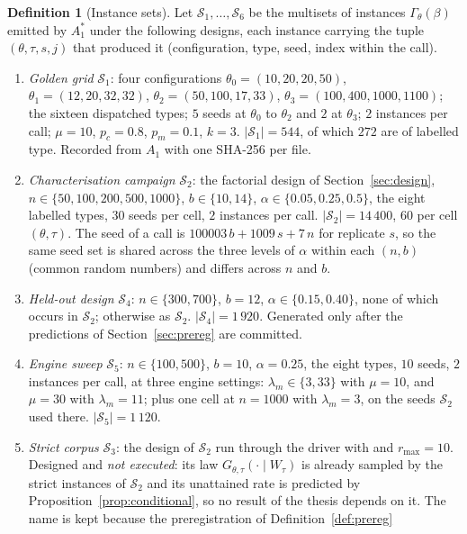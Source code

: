 \documentclass[a4paper,11pt]{article}
\newcommand{\Gam}{\Gamma_{\theta}}
\newcommand{\code}[1]{\path{#1}}
\newcommand{\Aone}{A_{1}}
\newcommand{\Astar}{A_{1}^{*}}
\newcommand{\Gtt}{G_{\theta,\tau}}
\theoremstyle{plain}
\theoremstyle{definition}
\newtheorem{definition}{Definition}
\theoremstyle{remark}
\begin{document}
\begin{definition}[Instance sets]\label{def:sets}
Let $\mathcal S_1,\dots,\mathcal S_6$ be the multisets of instances
$\Gam(\beta)$ emitted by $\Astar$ under the following designs, each instance carrying the
tuple $(\theta,\tau,s,j)$ that produced it (configuration, type, seed, index within the
call).
\begin{enumerate}[leftmargin=1.8em,itemsep=2pt]
\item \emph{Golden grid} $\mathcal S_1$: four configurations
$\theta_0=(10,20,20,50)$, $\theta_1=(12,20,32,32)$, $\theta_2=(50,100,17,33)$,
$\theta_3=(100,400,1000,1100)$; the sixteen dispatched types; $5$ seeds at $\theta_0$ to
$\theta_2$ and $2$ at $\theta_3$; $2$ instances per call; $\mu=10$, $p_c=0.8$, $p_m=0.1$,
$k=3$. $|\mathcal S_1|=544$, of which $272$ are of labelled type. Recorded from $\Aone$ with
one SHA-256 per file.
\item \emph{Characterisation campaign} $\mathcal S_2$: the factorial design of
Section~\ref{sec:design}, $n\in\{50,100,200,500,1000\}$, $b\in\{10,14\}$,
$\alpha\in\{0.05,0.25,0.5\}$, the eight labelled types, $30$ seeds per cell, $2$ instances
per call. $|\mathcal S_2|=14\,400$, $60$ per cell $(\theta,\tau)$. The seed of a call is
$100003\,b+1009\,s+7\,n$ for replicate $s$, so the same seed set is shared across the three
levels of $\alpha$ within each $(n,b)$ (common random numbers) and differs across $n$ and $b$.
\item \emph{Held-out design} $\mathcal S_4$: $n\in\{300,700\}$, $b=12$,
$\alpha\in\{0.15,0.40\}$, none of which occurs in $\mathcal S_2$; otherwise as $\mathcal S_2$.
$|\mathcal S_4|=1\,920$. Generated only after the predictions of Section~\ref{sec:prereg} are
committed.
\item \emph{Engine sweep} $\mathcal S_5$: $n\in\{100,500\}$, $b=10$, $\alpha=0.25$, the eight
types, $10$ seeds, $2$ instances per call, at three engine settings: $\lambda_m\in\{3,33\}$
with $\mu=10$, and $\mu=30$ with $\lambda_m=11$; plus one cell at $n=1000$ with
$\lambda_m=3$, on the seeds $\mathcal S_2$ used there. $|\mathcal S_5|=1\,120$.
\item \emph{Strict corpus} $\mathcal S_3$: the design of $\mathcal S_2$ run through the driver
with \code{--require-strict} and $r_{\max}=10$. Designed and \emph{not executed}: its law
$\Gtt(\cdot\mid W_\tau)$ is already sampled by the strict instances of $\mathcal S_2$ and its
unattained rate is predicted by Proposition~\ref{prop:conditional}, so no result of the thesis
depends on it. The name is kept because the preregistration of Definition~\ref{def:prereg}

\end{enumerate}
\end{definition}
\end{document}
